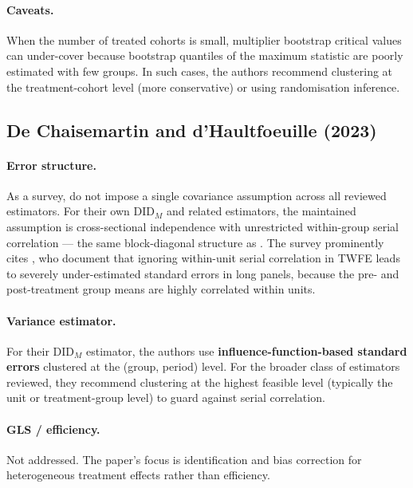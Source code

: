\documentclass[12pt]{article}
\begin{document}
\paragraph{Caveats.}
When the number of treated cohorts is small, multiplier bootstrap critical values
can under-cover because bootstrap quantiles of the maximum statistic are poorly
estimated with few groups.
In such cases, the authors recommend clustering at the treatment-cohort level
(more conservative) or using randomisation inference.

\subsection{De Chaisemartin and d'Haultfoeuille (2023)}

\paragraph{Error structure.}
As a survey, \citet{dechaisemartin2023twoway} do not impose a single covariance
assumption across all reviewed estimators.
For their own DID$_M$ and related estimators, the maintained assumption is
cross-sectional independence with unrestricted within-group serial correlation
--- the same block-diagonal structure as \citet{callaway2021difference}.
The survey prominently cites \citet{bertrand2004much}, who document that
ignoring within-unit serial correlation in TWFE leads to severely
under-estimated standard errors in long panels, because the pre- and
post-treatment group means are highly correlated within units.

\paragraph{Variance estimator.}
For their DID$_M$ estimator, the authors use \textbf{influence-function-based
standard errors} clustered at the (group, period) level.
For the broader class of estimators reviewed, they recommend clustering at the
highest feasible level (typically the unit or treatment-group level) to guard
against serial correlation.

\paragraph{GLS / efficiency.}
Not addressed.
The paper's focus is identification and bias correction for heterogeneous
treatment effects rather than efficiency.
\end{document}
